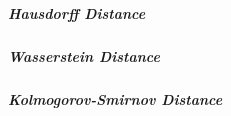 \subparagraph{Hausdorff Distance}
%

\subparagraph{Wasserstein Distance}
%
%

\subparagraph{Kolmogorov-Smirnov Distance}
%

